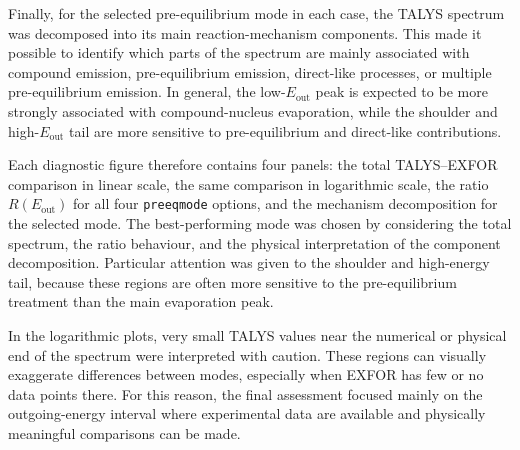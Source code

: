 Finally, for the selected pre-equilibrium mode in each case, the TALYS spectrum was decomposed into its main reaction-mechanism components. This made it possible to identify which parts of the spectrum are mainly associated with compound emission, pre-equilibrium emission, direct-like processes, or multiple pre-equilibrium emission. In general, the low-\(E_{\mathrm{out}}\) peak is expected to be more strongly associated with compound-nucleus evaporation, while the shoulder and high-\(E_{\mathrm{out}}\) tail are more sensitive to pre-equilibrium and direct-like contributions.

Each diagnostic figure therefore contains four panels: the total TALYS--EXFOR comparison in linear scale, the same comparison in logarithmic scale, the ratio \(R(E_{\mathrm{out}})\) for all four \texttt{preeqmode} options, and the mechanism decomposition for the selected mode. The best-performing mode was chosen by considering the total spectrum, the ratio behaviour, and the physical interpretation of the component decomposition. Particular attention was given to the shoulder and high-energy tail, because these regions are often more sensitive to the pre-equilibrium treatment than the main evaporation peak.

In the logarithmic plots, very small TALYS values near the numerical or physical end of the spectrum were interpreted with caution. These regions can visually exaggerate differences between modes, especially when EXFOR has few or no data points there. For this reason, the final assessment focused mainly on the outgoing-energy interval where experimental data are available and physically meaningful comparisons can be made.

\newpage
